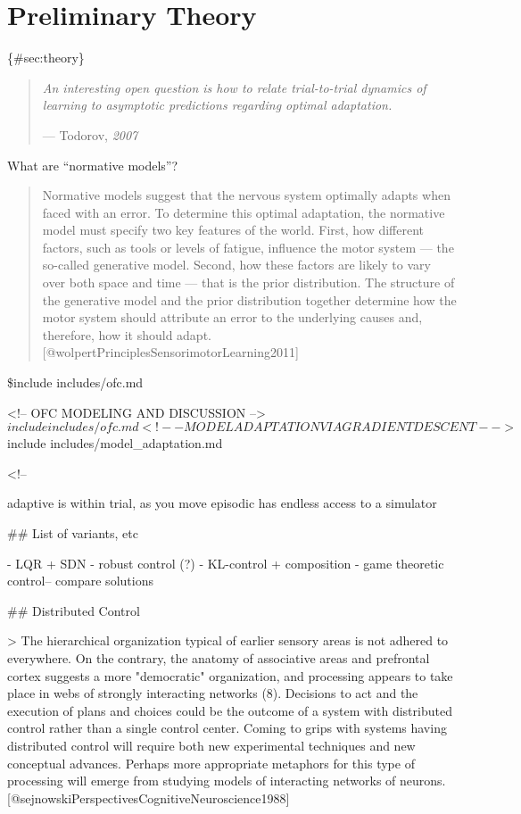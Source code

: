 \section{Preliminary Theory}\label{preliminary-theory}

\{\#sec:theory\}

\begin{quote}
\emph{An interesting open question is how to relate trial-to-trial
dynamics of learning to asymptotic predictions regarding optimal
adaptation.}

--- Todorov, \emph{2007}
\end{quote}

What are ``normative models''?

\begin{quote}
Normative models suggest that the nervous system optimally adapts when
faced with an error. To determine this optimal adaptation, the normative
model must specify two key features of the world. First, how different
factors, such as tools or levels of fatigue, influence the motor system
--- the so-called generative model. Second, how these factors are likely
to vary over both space and time --- that is the prior distribution. The
structure of the generative model and the prior distribution together
determine how the motor system should attribute an error to the
underlying causes and, therefore, how it should adapt.
{[}@wolpertPrinciplesSensorimotorLearning2011{]}
\end{quote}

\$include includes/ofc.md

<!-- OFC MODELING AND DISCUSSION -->
$include includes/ofc.md

<!-- MODEL ADAPTATION VIA GRADIENT DESCENT -->
$include includes/model_adaptation.md


<!-- 

adaptive is within trial, as you move
episodic has endless access to a simulator

## List of variants, etc 

- LQR + SDN
- robust control (?)
- KL-control + composition
- game theoretic control-- compare solutions

## Distributed Control

> The hierarchical organization typical of earlier sensory areas is not adhered to everywhere. On the contrary, the anatomy of associative areas and prefrontal  cortex suggests a more "democratic"  organization, and  processing  appears to take place  in webs of strongly interacting networks (8). Decisions to act and the execution of plans and  choices  could be the outcome of a  system with  distributed control rather than  a single control center. Coming to grips  with systems having distributed control will require both new experimental techniques and new  conceptual advances. Perhaps more  appropriate  metaphors for this  type of processing will emerge from studying  models of interacting  networks of neurons. [@sejnowskiPerspectivesCognitiveNeuroscience1988]

